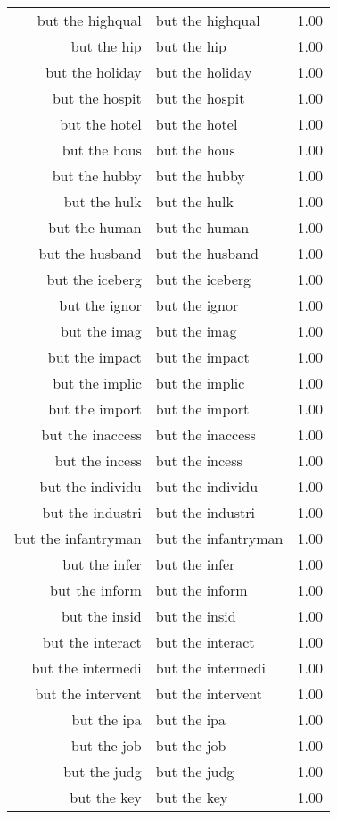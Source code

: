 \begin{table}[ht]
\begin{tabular}{rlr}
  but the highqual & but the highqual & 1.00 \\ 
  but the hip & but the hip & 1.00 \\ 
  but the holiday & but the holiday & 1.00 \\ 
  but the hospit & but the hospit & 1.00 \\ 
  but the hotel & but the hotel & 1.00 \\ 
  but the hous & but the hous & 1.00 \\ 
  but the hubby & but the hubby & 1.00 \\ 
  but the hulk & but the hulk & 1.00 \\ 
  but the human & but the human & 1.00 \\ 
  but the husband & but the husband & 1.00 \\ 
  but the iceberg & but the iceberg & 1.00 \\ 
  but the ignor & but the ignor & 1.00 \\ 
  but the imag & but the imag & 1.00 \\ 
  but the impact & but the impact & 1.00 \\ 
  but the implic & but the implic & 1.00 \\ 
  but the import & but the import & 1.00 \\ 
  but the inaccess & but the inaccess & 1.00 \\ 
  but the incess & but the incess & 1.00 \\ 
  but the individu & but the individu & 1.00 \\ 
  but the industri & but the industri & 1.00 \\ 
  but the infantryman & but the infantryman & 1.00 \\ 
  but the infer & but the infer & 1.00 \\ 
  but the inform & but the inform & 1.00 \\ 
  but the insid & but the insid & 1.00 \\ 
  but the interact & but the interact & 1.00 \\ 
  but the intermedi & but the intermedi & 1.00 \\ 
  but the intervent & but the intervent & 1.00 \\ 
  but the ipa & but the ipa & 1.00 \\ 
  but the job & but the job & 1.00 \\ 
  but the judg & but the judg & 1.00 \\ 
  but the key & but the key & 1.00 \\ 

\end{tabular}
\end{table}
